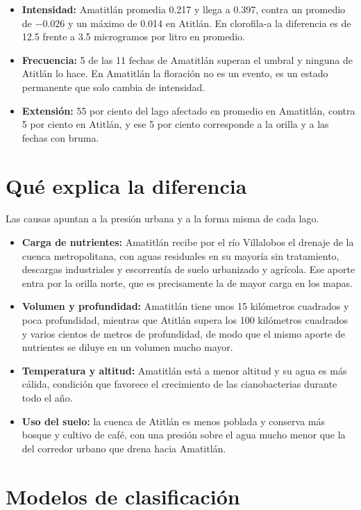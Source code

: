 \documentclass[10pt,a4paper]{article}
\begin{document}
\begin{itemize}
  \item \textbf{Intensidad:} Amatitlán promedia 0.217 y llega a 0.397, contra un promedio de $-0.026$ y un máximo de
  0.014 en Atitlán. En clorofila-a la diferencia es de 12.5 frente a 3.5 microgramos por litro en promedio.
  \item \textbf{Frecuencia:} 5 de las 11 fechas de Amatitlán superan el umbral y ninguna de Atitlán lo hace. En
  Amatitlán la floración no es un evento, es un estado permanente que solo cambia de intensidad.
  \item \textbf{Extensión:} 55 por ciento del lago afectado en promedio en Amatitlán, contra 5 por ciento en
  Atitlán, y ese 5 por ciento corresponde a la orilla y a las fechas con bruma.
\end{itemize}

\section{Qué explica la diferencia}

Las causas apuntan a la presión urbana y a la forma misma de cada lago.

\begin{itemize}
  \item \textbf{Carga de nutrientes:} Amatitlán recibe por el río Villalobos el drenaje de la cuenca metropolitana,
  con aguas residuales en su mayoría sin tratamiento, descargas industriales y escorrentía de suelo urbanizado y
  agrícola. Ese aporte entra por la orilla norte, que es precisamente la de mayor carga en los mapas.
  \item \textbf{Volumen y profundidad:} Amatitlán tiene unos 15 kilómetros cuadrados y poca profundidad, mientras
  que Atitlán supera los 100 kilómetros cuadrados y varios cientos de metros de profundidad, de modo que el mismo
  aporte de nutrientes se diluye en un volumen mucho mayor.
  \item \textbf{Temperatura y altitud:} Amatitlán está a menor altitud y su agua es más cálida, condición que
  favorece el crecimiento de las cianobacterias durante todo el año.
  \item \textbf{Uso del suelo:} la cuenca de Atitlán es menos poblada y conserva más bosque y cultivo de café, con
  una presión sobre el agua mucho menor que la del corredor urbano que drena hacia Amatitlán.
\end{itemize}

\section{Modelos de clasificación}
\end{document}
